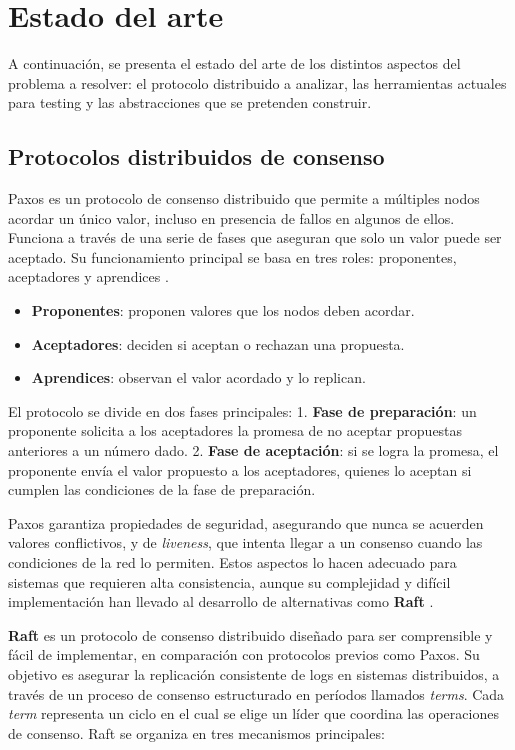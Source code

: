 \documentclass[12pt]{article}
\begin{document}
\section{Estado del arte}

A continuación, se presenta el estado del arte de los distintos aspectos del problema a resolver: el protocolo distribuido a analizar, las herramientas actuales para testing y las abstracciones que se pretenden construir.

\subsection{Protocolos distribuidos de consenso}

Paxos es un protocolo de consenso distribuido que permite a múltiples nodos acordar un único valor, incluso en presencia de fallos en algunos de ellos. Funciona a través de una serie de fases que aseguran que solo un valor puede ser aceptado. Su funcionamiento principal se basa en tres roles: proponentes, aceptadores y aprendices \cite{lamport1998paxos}.

\begin{itemize}
    \item \textbf{Proponentes}: proponen valores que los nodos deben acordar.
    \item \textbf{Aceptadores}: deciden si aceptan o rechazan una propuesta.
    \item \textbf{Aprendices}: observan el valor acordado y lo replican.
\end{itemize}

El protocolo se divide en dos fases principales:
1. \textbf{Fase de preparación}: un proponente solicita a los aceptadores la promesa de no aceptar propuestas anteriores a un número dado.
2. \textbf{Fase de aceptación}: si se logra la promesa, el proponente envía el valor propuesto a los aceptadores, quienes lo aceptan si cumplen las condiciones de la fase de preparación.

Paxos garantiza propiedades de seguridad, asegurando que nunca se acuerden valores conflictivos, y de \textit{liveness}, que intenta llegar a un consenso cuando las condiciones de la red lo permiten. Estos aspectos lo hacen adecuado para sistemas que requieren alta consistencia, aunque su complejidad y difícil implementación han llevado al desarrollo de alternativas como \textbf{Raft} \cite{ongaro2014raft}.


\textbf{Raft} es un protocolo de consenso distribuido diseñado para ser comprensible y fácil de implementar, en comparación con protocolos previos como Paxos. Su objetivo es asegurar la replicación consistente de logs en sistemas distribuidos, a través de un proceso de consenso estructurado en períodos llamados \textit{terms}. Cada \textit{term} representa un ciclo en el cual se elige un líder que coordina las operaciones de consenso. Raft se organiza en tres mecanismos principales:
\end{document}
